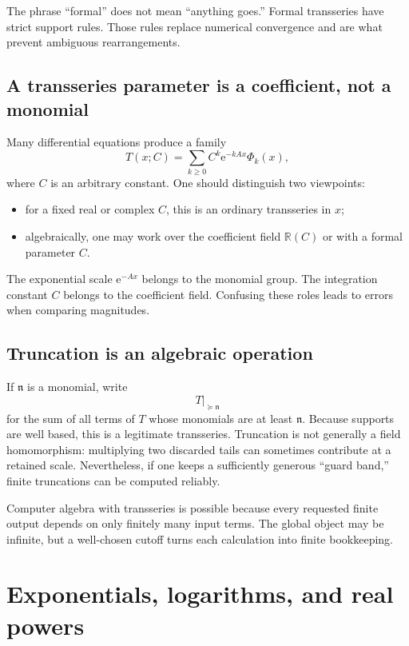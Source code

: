 \documentclass[11pt,openany]{book}
\theoremstyle{plain}
\theoremstyle{definition}
\theoremstyle{remark}
\newcommand{\R}{\mathbb{R}}
\newcommand{\n}{\mathfrak{n}}
\newcommand{\e}{\mathrm{e}}
\begin{document}
\begin{warningbox}
The phrase ``formal'' does not mean ``anything goes.'' Formal transseries have strict support rules. Those rules replace numerical convergence and are what prevent ambiguous rearrangements.
\end{warningbox}

\section{A transseries parameter is a coefficient, not a monomial}
Many differential equations produce a family
\[
  T(x;C)=\sum_{k\ge0}C^k\e^{-kAx}\Phi_k(x),
\]
where $C$ is an arbitrary constant. One should distinguish two viewpoints:
\begin{itemize}
\item for a fixed real or complex $C$, this is an ordinary transseries in $x$;
\item algebraically, one may work over the coefficient field $\R(C)$ or with a formal parameter $C$.
\end{itemize}
The exponential scale $\e^{-Ax}$ belongs to the monomial group. The integration constant $C$ belongs to the coefficient field. Confusing these roles leads to errors when comparing magnitudes.

\section{Truncation is an algebraic operation}
If $\n$ is a monomial, write
\[
  T\big|_{\succeq\n}
\]
for the sum of all terms of $T$ whose monomials are at least $\n$. Because supports are well based, this is a legitimate transseries. Truncation is not generally a field homomorphism: multiplying two discarded tails can sometimes contribute at a retained scale. Nevertheless, if one keeps a sufficiently generous ``guard band,'' finite truncations can be computed reliably.

\begin{ideabox}
Computer algebra with transseries is possible because every requested finite output depends on only finitely many input terms. The global object may be infinite, but a well-chosen cutoff turns each calculation into finite bookkeeping.
\end{ideabox}

\chapter{Exponentials, logarithms, and real powers}
\label{chap:explog}
\end{document}
